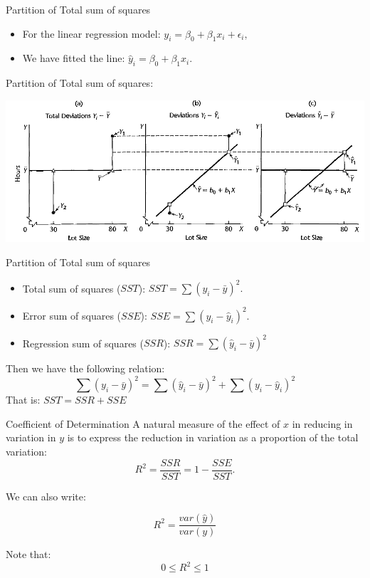 \documentclass[
  ignorenonframetext,
]{beamer}
\begin{document}
\begin{frame}{Partition of Total sum of squares}
\protect\hypertarget{partition-of-total-sum-of-squares}{}
\begin{itemize}
\item
  For the linear regression model:
  \(y_i=\beta_0+\beta_1x_i+\epsilon_i,\)
\item
  We have fitted the line: \(\hat{y}_i=\beta_0+\beta_1x_i.\)
\end{itemize}

Partition of Total sum of squares:

\begin{center}\includegraphics[width=0.65\linewidth]{week2_5} \end{center}
\end{frame}

\begin{frame}{Partition of Total sum of squares}
\protect\hypertarget{partition-of-total-sum-of-squares-1}{}
\begin{itemize}
\item
  Total sum of squares (\(SST\)): \(SST=\sum(y_i-\bar{y})^2.\)
\item
  Error sum of squares (\(SSE\)): \(SSE=\sum (y_i-\hat{y}_i)^2.\)
\item
  Regression sum of squares (\(SSR\)):
  \(SSR=\sum (\hat{y}_i-\bar{y})^2\)
\end{itemize}

Then we have the following relation:
\[\sum(y_i-\bar{y})^2=\sum (\hat{y}_i-\bar{y})^2+\sum (y_i-\hat{y}_i)^2\]
That is: \(SST=SSR+SSE\)
\end{frame}

\begin{frame}{Coefficient of Determination}
\protect\hypertarget{coefficient-of-determination}{}
A natural measure of the effect of \(x\) in reducing in variation in
\(y\) is to express the reduction in variation as a proportion of the
total variation: \[R^2=\frac{SSR}{SST}=1-\frac{SSE}{SST}.\]

We can also write:

\[R^2=\frac{var(\hat{y})}{var(y)}\]

Note that: \[0\leq R^2 \leq 1\]
\end{frame}
\end{document}
